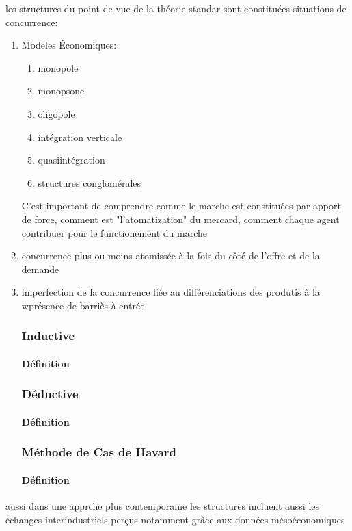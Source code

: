 \documentclass{article}
\begin{document}
les structures du point de vue de la théorie standar sont constituées situations de concurrence:
\begin{enumerate}
    \item Modeles Économiques:
    \begin{enumerate}
        \item monopole
        \item monopsone
        \item oligopole
        \item intégration verticale
        \item quasiintégration
        \item structures conglomérales
    \end{enumerate}
    C'est important de comprendre comme le marche est constituées par apport de force, comment est "l'atomatization" du mercard, comment chaque agent contribuer pour le functionement du marche
    \item concurrence plus ou moins atomissée à la fois du côté de l'offre et de la demande
    \item imperfection de la concurrence liée au différenciations des produtis à la wprésence de barriès à entrée
    \subsubsection{Inductive}
    \paragraph{Définition}
    
    \subsubsection{Déductive}
    \paragraph{Définition}
    
    \subsubsection{Méthode de Cas de Havard}
    \paragraph{Définition}
    
    
    
\end{enumerate}
aussi dans une apprche plus contemporaine les structures incluent aussi les échanges interindustriels perçus notamment grâce aux données mésoéconomiques
\end{document}
